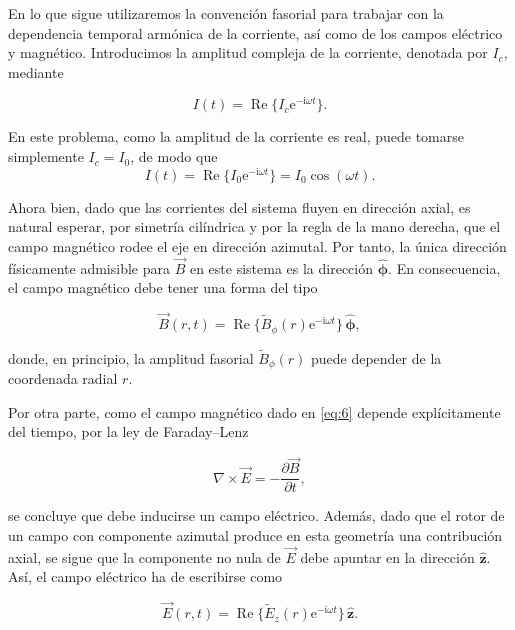 \documentclass{article}
\numberwithin{equation}{section}
\newcommand{\e}{\mathrm{e}}
\newcommand{\iu}{\mathrm{i}}
\newcommand{\pp}[2]{\frac{\partial #1}{\partial #2}}
\newcommand{\hp}{\hat{\boldsymbol\phi}}
\newcommand{\hz}{\hat{\mathbf z}}
\begin{document}
En lo que sigue utilizaremos la convención fasorial para trabajar con la dependencia temporal armónica de la corriente, así como de los campos eléctrico y magnético. Introducimos la amplitud compleja de la corriente, denotada por $I_c$, mediante

\begin{equation}\tag{5}\label{eq:5}
    I(t)=\operatorname{Re}\{I_c\e^{-\iu\omega t}\}.
\end{equation}

En este problema, como la amplitud de la corriente es real, puede tomarse simplemente $I_c=I_0$, de modo que
\begin{equation*}
    I(t)=\operatorname{Re}\{I_0\e^{-\iu\omega t}\}=I_0\cos(\omega t).
\end{equation*}

Ahora bien, dado que las corrientes del sistema fluyen en dirección axial, es natural esperar, por simetría cilíndrica y por la regla de la mano derecha, que el campo magnético rodee el eje en dirección azimutal. Por tanto, la única dirección físicamente admisible para $\vec B$ en este sistema es la dirección $\hp$. En consecuencia, el campo magnético debe tener una forma del tipo

\begin{equation}\tag{6}\label{eq:6}
    \vec B(r,t)=\operatorname{Re}\{\widetilde B_{\phi}(r)\e^{-\iu\omega t}\}\,\hp,
\end{equation}

donde, en principio, la amplitud fasorial $\widetilde B_{\phi}(r)$ puede depender de la coordenada radial $r$.

Por otra parte, como el campo magnético dado en \eqref{eq:6} depende explícitamente del tiempo, por la ley de Faraday--Lenz

\begin{equation}\tag{7}\label{eq:7}
    \nabla\times \vec E=-\pp{\vec B}{t},
\end{equation}

se concluye que debe inducirse un campo eléctrico. Además, dado que el rotor de un campo con componente azimutal produce en esta geometría una contribución axial, se sigue que la componente no nula de $\vec E$ debe apuntar en la dirección $\hz$. Así, el campo eléctrico ha de escribirse como

\begin{equation}\tag{8}\label{eq:8}
    \vec E(r,t)=\operatorname{Re}\{\widetilde E_z(r)\e^{-\iu\omega t}\}\,\hz.
\end{equation}
\end{document}
